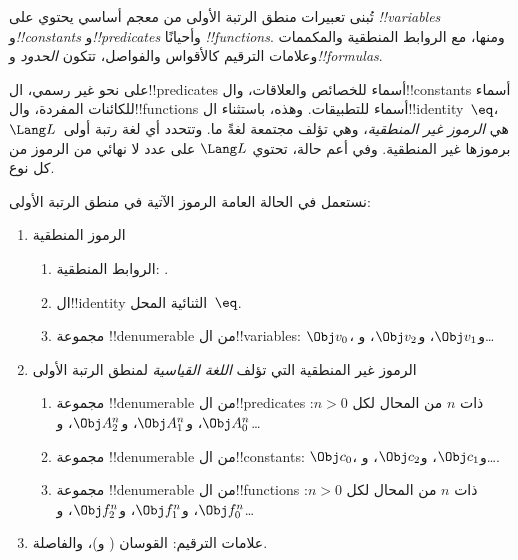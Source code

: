 \documentclass[../../../include/open-logic-section]{subfiles}
\begin{document}



تُبنى تعبيرات منطق الرتبة الأولى من معجم أساسي يحتوي على
\emph{!!{variable}s} و\emph{!!{constant}s} و\emph{!!{predicate}s}
وأحيانًا \emph{!!{function}s}. ومنها، مع الروابط المنطقية والمكممات
وعلامات الترقيم كالأقواس والفواصل، تتكون \emph{الحدود}
و\emph{!!{formula}s}.

\begin{explain}
على نحو غير رسمي، ال!!{predicate}s أسماء للخصائص والعلاقات،
وال!!{constant}s أسماء للكائنات المفردة، وال!!{function}s أسماء
للتطبيقات. وهذه، باستثناء ال!!{identity}~$\eq$، هي
\emph{الرموز غير المنطقية}، وهي تؤلف مجتمعة لغةً ما. وتتحدد أي لغة
رتبة أولى~$\Lang L$ برموزها غير المنطقية. وفي أعم حالة، تحتوي
$\Lang L$ على عدد لا نهائي من الرموز من كل نوع.
\end{explain}

نستعمل في الحالة العامة الرموز الآتية في منطق الرتبة الأولى:

\begin{enumerate}
\item الرموز المنطقية
\begin{enumerate}
\item الروابط المنطقية:
  \startycommalist
  .
\item ال!!{identity} الثنائية المحل~$\eq$.
\item مجموعة !!{denumerable} من ال!!{variable}s: $\Obj v_0$، و$\Obj v_1$، و$\Obj
  v_2$، و\dots
\end{enumerate}
\item الرموز غير المنطقية التي تؤلف \emph{اللغة القياسية} لمنطق
  الرتبة الأولى
\begin{enumerate}
\item مجموعة !!{denumerable} من ال!!{predicate}s ذات $n$ من المحال لكل
  $n>0$: $\Obj A^n_0$، و$\Obj A^n_1$، و$\Obj A^n_2$، و\dots
\item مجموعة !!{denumerable} من ال!!{constant}s: $\Obj c_0$، و$\Obj c_1$، و$\Obj
  c_2$، و\dots.
\item مجموعة !!{denumerable} من ال!!{function}s ذات $n$ من المحال لكل
  $n>0$: $\Obj f^n_0$، و$\Obj f^n_1$، و$\Obj f^n_2$، و\dots
\end{enumerate}
\item علامات الترقيم: القوسان ( و)، والفاصلة.
\end{enumerate}
\end{document}
